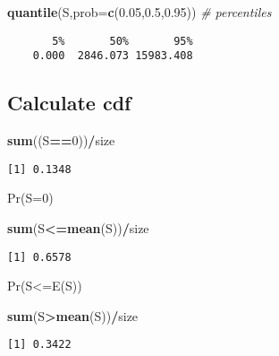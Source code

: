 \documentclass[]{book}
\newenvironment{Shaded}{\begin{snugshade}}{\end{snugshade}}
\newcommand{\KeywordTok}[1]{\textcolor[rgb]{0.13,0.29,0.53}{\textbf{#1}}}
\newcommand{\DataTypeTok}[1]{\textcolor[rgb]{0.13,0.29,0.53}{#1}}
\newcommand{\DecValTok}[1]{\textcolor[rgb]{0.00,0.00,0.81}{#1}}
\newcommand{\FloatTok}[1]{\textcolor[rgb]{0.00,0.00,0.81}{#1}}
\newcommand{\CommentTok}[1]{\textcolor[rgb]{0.56,0.35,0.01}{\textit{#1}}}
\newcommand{\OperatorTok}[1]{\textcolor[rgb]{0.81,0.36,0.00}{\textbf{#1}}}
\newcommand{\NormalTok}[1]{#1}
\theoremstyle{definition}
\theoremstyle{definition}
\theoremstyle{definition}
\theoremstyle{remark}
\begin{document}
\begin{Shaded}
\begin{Highlighting}[]
\KeywordTok{quantile}\NormalTok{(S,}\DataTypeTok{prob=}\KeywordTok{c}\NormalTok{(}\FloatTok{0.05}\NormalTok{,}\FloatTok{0.5}\NormalTok{,}\FloatTok{0.95}\NormalTok{))   }\CommentTok{# percentiles}
\end{Highlighting}
\end{Shaded}

\begin{verbatim}
       5%       50%       95% 
    0.000  2846.073 15983.408 
\end{verbatim}

\subsection{Calculate cdf}\label{calculate-cdf}

\begin{Shaded}
\begin{Highlighting}[]
\KeywordTok{sum}\NormalTok{((S}\OperatorTok{==}\DecValTok{0}\NormalTok{))}\OperatorTok{/}\NormalTok{size}
\end{Highlighting}
\end{Shaded}

\begin{verbatim}
[1] 0.1348
\end{verbatim}

Pr(S=0)

\begin{Shaded}
\begin{Highlighting}[]
\KeywordTok{sum}\NormalTok{(S}\OperatorTok{<=}\KeywordTok{mean}\NormalTok{(S))}\OperatorTok{/}\NormalTok{size}
\end{Highlighting}
\end{Shaded}

\begin{verbatim}
[1] 0.6578
\end{verbatim}

Pr(S\textless{}=E(S))

\begin{Shaded}
\begin{Highlighting}[]
\KeywordTok{sum}\NormalTok{(S}\OperatorTok{>}\KeywordTok{mean}\NormalTok{(S))}\OperatorTok{/}\NormalTok{size }
\end{Highlighting}
\end{Shaded}

\begin{verbatim}
[1] 0.3422
\end{verbatim}
\end{document}

